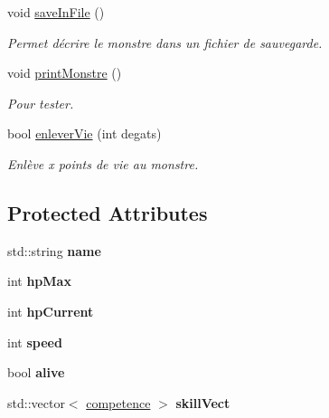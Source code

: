 \begin{DoxyCompactItemize}
\mbox{\label{classmonstre_ad3d2efc38609b3857e542423809a566d}} 
void \hyperlink{classmonstre_ad3d2efc38609b3857e542423809a566d}{save\+In\+File} ()
\begin{DoxyCompactList}\small\item\em Permet d\textquotesingle{}écrire le monstre dans un fichier de sauvegarde. \end{DoxyCompactList}\item 
\mbox{\label{classmonstre_aeb60395664bbca7846e037b058b5c716}} 
void \hyperlink{classmonstre_aeb60395664bbca7846e037b058b5c716}{print\+Monstre} ()
\begin{DoxyCompactList}\small\item\em Pour tester. \end{DoxyCompactList}\item 
bool \hyperlink{classmonstre_af5b61c4c0e2118760ce6f610bf9349e2}{enlever\+Vie} (int degats)
\begin{DoxyCompactList}\small\item\em Enlève x points de vie au monstre. \end{DoxyCompactList}\end{DoxyCompactItemize}
\subsection*{Protected Attributes}
\begin{DoxyCompactItemize}
\item 
\mbox{\label{classmonstre_a477ba81185ff1dc77ebedf2b72afbb05}} 
std\+::string {\bfseries name}
\item 
\mbox{\label{classmonstre_a6cca6a9a3788ab7fca2e6ee7c321b7ea}} 
int {\bfseries hp\+Max}
\item 
\mbox{\label{classmonstre_afc39f2b9c79b34c7690886b9fd1f97f9}} 
int {\bfseries hp\+Current}
\item 
\mbox{\label{classmonstre_a2a118a2943476096ff05f0ddbee5a2eb}} 
int {\bfseries speed}
\item 
\mbox{\label{classmonstre_aca8671e46fd6e20fd0c1afeb276f6da4}} 
bool {\bfseries alive}
\item 
\mbox{\label{classmonstre_a6540a325121334ddbb8847cbf97f869a}} 
std\+::vector$<$ \hyperlink{classcompetence}{competence} $>$ {\bfseries skill\+Vect}
\end{DoxyCompactItemize}


